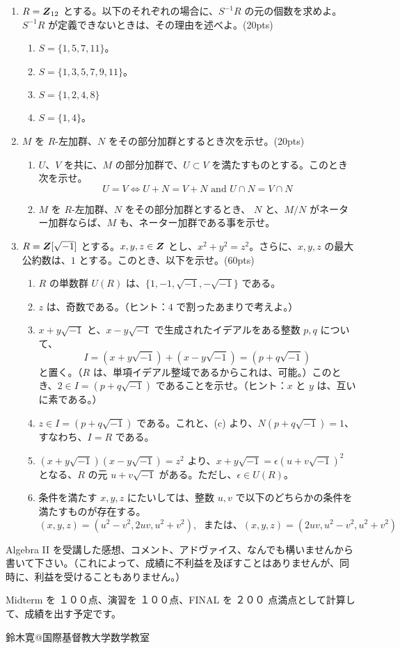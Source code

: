 \begin{enumerate}
\medskip      
\item $R = \mbox{\boldmath $Z$}_{12}$ とする。以下のそれぞれの場合に、$S^{-1}R$ の元の個数を求めよ。$S^{-1}R$ が定義できないときは、その理由を述べよ。(20pts)
	\begin{enumerate}
	\item $S = \{1, 5, 7, 11\}$。
	\item $S = \{1,3,5,7,9,11\}$。
	\item $S = \{1,2,4,8\}$
	\item $S = \{1,4\}$。
	\end{enumerate}

\medskip   
\item $M$ を $R$-左加群、$N$ をその部分加群とするとき次を示せ。(20pts)
	\begin{enumerate}
	\item $U$、$V$ を共に、$M$ の部分加群で、$U\subset V$  を満たすものとする。このとき次を示せ。
$$U = V \Leftrightarrow U+N = V+N \mbox{ and } U\cap N = V\cap N$$
	\item $M$ を $R$-左加群、$N$ をその部分加群とするとき、
$N$ と、$M/N$ がネーター加群ならば、$M$ も、ネーター加群である事を示せ。
	\end{enumerate}

\newpage	
\item $R = \mbox{\boldmath $Z$}[\sqrt{-1}]$ とする。$x,y,z\in\mbox{\boldmath $Z$}$ とし、$x^2 + y^2  = z^2$。さらに、$x,y,z$ の最大公約数は、$1$ とする。このとき、以下を示せ。(60pts)
	\begin{enumerate}
	\item $R$ の単数群 $U(R)$ は、$\{1,-1,\sqrt{-1},-\sqrt{-1}\}$ である。
	\item $z$ は、奇数である。（ヒント：$4$ で割ったあまりで考えよ。）
	\item $x+y\sqrt{-1}$ と、$x-y\sqrt{-1}$ で生成されたイデアルをある整数 $p,q$ について、 
	$$I = (x+y\sqrt{-1}) + (x-y\sqrt{-1}) = (p+q\sqrt{-1})$$
	と置く。（$R$ は、単項イデアル整域であるからこれは、可能。）このとき、$2\in I = (p+q\sqrt{-1})$ であることを示せ。（ヒント：$x$ と $y$ は、互いに素である。）
	\item $z\in I = (p+q\sqrt{-1})$ である。これと、(c) より、$N(p+q\sqrt{-1}) = 1$、すなわち、$I = R$ である。
	\item $(x+y\sqrt{-1})(x-y\sqrt{-1}) = z^2$ より、$x + y\sqrt{-1} = \epsilon(u+v\sqrt{-1})^2$ となる、$R$ の元 $u+v\sqrt{-1}$ がある。ただし、$\epsilon\in U(R)$。
	\item 条件を満たす $x,y,z$ にたいしては、整数 $u,v$ で以下のどちらかの条件を満たすものが存在する。
		$$(x,y,z) = (u^2-v^2,2uv,u^2+v^2), \;\mbox{ または、}(x,y,z) = (2uv,u^2-v^2,u^2+v^2)$$
	\end{enumerate}
\end{enumerate}

 

\vspace{5ex}
\noindent Algebra II を受講した感想、コメント、アドヴァイス、なんでも構いませんから書いて下さい。（これによって、成績に不利益を及ぼすことはありませんが、同時に、利益を受けることもありません。）

\vspace{2ex}
\noindent
Midterm を １００点、演習を １００点、FINAL を ２００ 点満点として計算して、成績を出す予定です。
         

\begin{flushright}
鈴木寛@国際基督教大学数学教室
\end{flushright}
